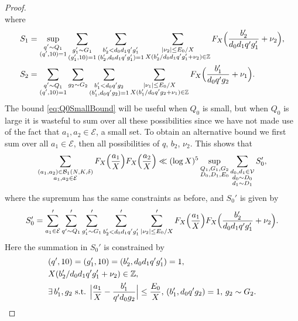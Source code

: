 \documentclass[10pt]{amsart}
\theoremstyle{plain}
\numberwithin{sblmm}{thrm}
\numberwithin{equation}{section}
\begin{document}
\begin{proof}
\begin{equation}
\label{eq:Q0SmallBound}
\end{equation}
where
%
\begin{align}
S_1&=\sup_{\substack{q'\sim Q_1\\ (q',10)=1}}\sum_{\substack{g_1'\sim G_1\\ (g_1',10)=1}} \sum_{\substack{b_2'<d_0d_1 q' g_1' \\ (b_2',d_0 d_1 q' g_1')=1}}\sum_{\substack{|\nu_2|\le E_0/X\\ X(b_2'/d_0 d_1 q' g_1'+\nu_2)\in\mathbb{Z}}}F_{X}\Bigl(\frac{b_2'}{d_0 d_1 q' g_1'}+\nu_2\Bigr),\label{eq:S1Def}\\
S_2&=\sum_{\substack{q'\sim Q_1\\ (q',10)=1}} \sum_{g_2\sim G_2}\sum_{\substack{b_1'<d_0 q' g_2 \\ (b_1',d_0 q' g_2)=1}} \sum_{\substack{|\nu_1|\le E_0/X \\ X(b_1'/d_0 q'g_2+\nu_1)\in\mathbb{Z}}}F_{X}\Bigl(\frac{b_1'}{d_0 q' g_2}+\nu_1\Bigr).\label{eq:S2Def}
\end{align}
%
The bound \eqref{eq:Q0SmallBound} will be useful when $Q_0$ is small, but when $Q_0$ is large it is wasteful to sum over all these possibilities since we have not made use of the fact that $a_1,a_2\in \mathcal{E}$, a small set. To obtain an alternative bound we first sum over all $a_1\in\mathcal{E}$, then all possibilities of $q$, $b_2$, $\nu_2$. This shows that
%
\begin{align}
\sum_{\substack{(a_1,a_2)\in\mathcal{B}_1(N,K,\delta) \\ a_1,a_2\in\mathcal{E} }}F_X\Bigl(\frac{a_1}{X}\Bigr)F_X\Bigl(\frac{a_2}{X}\Bigr)
\ll (\log{X})^5\sup_{\substack{Q_1,G_1,G_2\\ D_0,D_1,E_0}}\sum_{\substack{d_0,d_1\in\mathcal{V}\\ d_0\sim D_0\\ d_1\sim D_1}}S_0',\label{eq:Q0LargeBound1}
\end{align}
where the supremum has the same constraints as before, and $S_0'$ is given by
\[
S_0'=\sum'_{a_1\in\mathcal{E}}\sum'_{q'\sim Q_1}\sum_{g_1'\sim G_1}'\sum'_{\substack{b_2'<d_0d_1q'g_1'}}\sum'_{|\nu_2|\le E_0/X}F_X\Bigl(\frac{a_1}{X}\Bigr)F_X\Bigl(\frac{b_2'}{d_0 d_1q' g_1'}+\nu_2\Bigr).
\]
Here the summation in $S_0'$ is constrained by
\begin{align*}
&(q',10)=(g_1',10)=(b_2',d_0d_1q' g_1')=1,\\
&X(b_2'/d_0 d_1 q' g_1'+\nu_2)\in\mathbb{Z},\\
&\exists\, b_1',g_2\text{ s.t. }\Bigl|\frac{a_1}{X}-\frac{b_1'}{q' d_0g_2}\Bigr|\le \frac{E_0}{X},\,(b_1',d_0q' g_2)=1,\,g_2\sim G_2.

\end{align*}
\end{proof}
\end{document}
